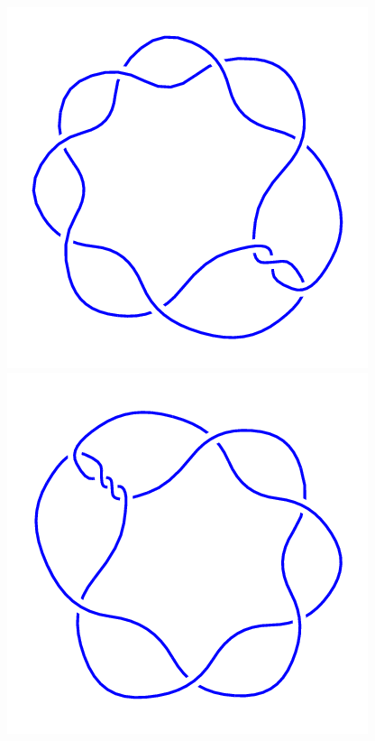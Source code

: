 \begin{figure}[H]
\begin{minipage}[b]{.18\linewidth}
    \end{minipage}
    \begin{minipage}[b]{.18\linewidth}
        \centering
        \includegraphics[width=\linewidth]{../data/9_3.png}
    \end{minipage}
    \begin{minipage}[b]{.18\linewidth}
        \centering
        \includegraphics[width=\linewidth]{../data/9_4.png}

\end{minipage}
\end{figure}
